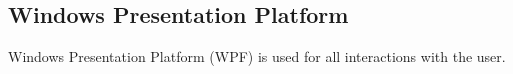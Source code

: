\subsection{Windows Presentation Platform} \label{ssc:tech_wpf}
Windows Presentation Platform (WPF) is used for all interactions with the user.